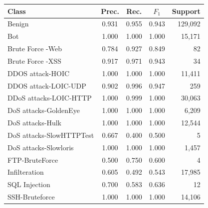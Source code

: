 \begin{tabular}{lcccr}
\toprule
Class & Prec. & Rec. & $F_1$ & Support \\
\midrule
Benign & 0.931 & 0.955 & 0.943 & 129,092 \\
Bot & 1.000 & 1.000 & 1.000 & 15,171 \\
Brute Force -Web & 0.784 & 0.927 & 0.849 & 82 \\
Brute Force -XSS & 0.917 & 0.971 & 0.943 & 34 \\
DDOS attack-HOIC & 1.000 & 1.000 & 1.000 & 11,411 \\
DDOS attack-LOIC-UDP & 0.902 & 0.996 & 0.947 & 259 \\
DDoS attacks-LOIC-HTTP & 1.000 & 0.999 & 1.000 & 30,063 \\
DoS attacks-GoldenEye & 1.000 & 1.000 & 1.000 & 6,209 \\
DoS attacks-Hulk & 1.000 & 1.000 & 1.000 & 12,544 \\
DoS attacks-SlowHTTPTest & 0.667 & 0.400 & 0.500 & 5 \\
DoS attacks-Slowloris & 1.000 & 1.000 & 1.000 & 1,457 \\
FTP-BruteForce & 0.500 & 0.750 & 0.600 & 4 \\
Infilteration & 0.605 & 0.492 & 0.543 & 17,985 \\
SQL Injection & 0.700 & 0.583 & 0.636 & 12 \\
SSH-Bruteforce & 1.000 & 1.000 & 1.000 & 14,106 \\
\bottomrule
\end{tabular}
